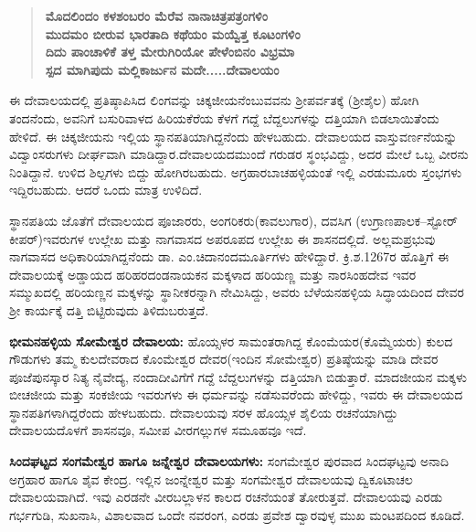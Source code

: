 \begin{verse}
\textbf{ಮೊದಲಿಂದಂ ಕಳಶಂಬರಂ ಮೆರೆವ ನಾನಾಚಿತ್ರಪತ್ರಂಗಳಿಂ} \\\textbf{ಮುದಮಂ ಬೀರುವ ಭಾರತಾದಿ ಕಥೆಯಂ ಮಯ್ವೆತ್ತ ಕೂಟಂಗಳಿಂ} \\\textbf{ದಿದು ಪಾಂಚಾಳಿಕೆ ತಳ್ತ ಮೇರುಗಿರಿಯೋ ಪೇಳೆಂಬಿನಂ ವಿಭ್ರಮಾ} \\\textbf{ಸ್ಪದ ಮಾಗಿಪುದು ಮಲ್ಲಿಕಾರ್ಜುನ ಮದೇ.....ದೇವಾಲಯಂ}
\end{verse}

ಈ ದೇವಾಲಯದಲ್ಲಿ ಪ್ರತಿಷ್ಠಾಪಿಸಿದ ಲಿಂಗವನ್ನು ಚಿಕ್ಕಜೀಯನೆಂಬುವವನು ಶ‍್ರೀಪರ್ವತಕ್ಕೆ (ಶ‍್ರೀಶೈಲ) ಹೋಗಿ ತಂದನೆಂದು, ಅವನಿಗೆ ಬಸುರಿವಾಳದ ಹಿರಿಯಕೆರೆಯ ಕೆಳಗೆ ಗದ್ದೆ ಬೆದ್ದಲುಗಳನ್ನು ದತ್ತಿಯಾಗಿ ಬಿಡಲಾಯಿತೆಂದು ಹೇಳಿದೆ. ಈ ಚಿಕ್ಕಜೀಯನು ಇಲ್ಲಿಯ ಸ್ಥಾನಪತಿಯಾಗಿದ್ದನೆಂದು ಹೇಳಬಹುದು. ದೇವಾಲಯದ ವಾಸ್ತುವರ್ಣನೆಯನ್ನು ವಿದ್ವಾಂಸರುಗಳು ದೀರ್ಘವಾಗಿ ಮಾಡಿದ್ದಾರ.ದೇವಾಲಯದಮುಂದೆ ಗರುಡರ ಸ್ಥಂಭವಿದ್ದು, ಅದರ ಮೇಲೆ ಒಬ್ಬ ವೀರನು ನಿಂತಿದ್ದಾನೆ. ಉಳಿದ ಶಿಲ್ಪಗಳು ಬಿದ್ದು ಹೋಗಿರಬಹುದು. ಅಗ್ರಹಾರಬಾಚಹಳ್ಳಿಯಂತೆ ಇಲ್ಲಿ ಎರಡುಮೂರು ಸ್ತಂಭಗಳು ಇದ್ದಿರಬಹುದು. ಆದರೆ ಒಂದು ಮಾತ್ರ ಉಳಿದಿದೆ.

ಸ್ಥಾನಪತಿಯ ಜೊತೆಗೆ ದೇವಾಲಯದ ಪೂಜಾರರು, ಅಂಗರಿಕರು(ಕಾವಲುಗಾರ), ದವಸಿಗ (ಉಗ್ರಾಣಪಾಲಕ–ಸ್ಟೋರ್​ಕೀಪರ್​)ಇವರುಗಳ ಉಲ್ಲೇಖ ಮತ್ತು ನಾಗವಾಸದ ಅಪರೂಪದ ಉಲ್ಲೇಖ ಈ ಶಾಸನದಲ್ಲಿದೆ. ಅಲ್ಲಮಪ್ರಭುವು ನಾಗವಾಸದ ಅಧಿಕಾರಿಯಾಗಿದ್ದನೆಂದು ಡಾ. ಎಂ.ಚಿದಾನಂದಮೂರ್ತಿಗಳು ಹೇಳಿದ್ದಾರೆ. ಕ್ರಿ.ಶ.1267ರ ಹೊತ್ತಿಗೆ ಈ ದೇವಾಲಯಕ್ಕೆ ಅಡ್ಡಾಯದ ಹರಿಹರದಂಡನಾಯಕನ ಮಕ್ಕಳಾದ ಹರಿಯಣ್ಣ ಮತ್ತು ನಾರಸಿಂಹದೇವ ಇವರ ಸಮ್ಮುಖದಲ್ಲಿ ಹರಿಯಣ್ಣನ ಮಕ್ಕಳನ್ನು ಸ್ಥಾನೀಕರನ್ನಾಗಿ ನೇಮಿಸಿದ್ದು, ಅವರು ಬೆಳೆಯನಹಳ್ಳಿಯ ಸಿದ್ಧಾಯದಿಂದ ದೇವರ ಶ‍್ರೀ ಕಾರ್ಯಕ್ಕೆ ದತ್ತಿ ಬಿಟ್ಟಿರುವುದು ತಿಳಿದುಬರುತ್ತದೆ.

\textbf{ಭೀಮನಹಳ್ಳಿಯ ಸೋಮೇಶ್ವರ ದೇವಾಲಯ:} ಹೊಯ್ಸಳರ ಸಾಮಂತರಾಗಿದ್ದ ಕೊಂಮೆಯರ(ಕೊಮ್ಮೆಯರು) ಕುಲದ ಗೌಡುಗಳು ತಮ್ಮ ಕುಲದೇವರಾದ ಕೊಂಮೇಶ್ವರ ದೇವರ(ಇಂದಿನ ಸೋಮೇಶ್ವರ) ಪ್ರತಿಷ್ಠೆಯನ್ನು ಮಾಡಿ ದೇವರ ಪೂಜೆಪುನಸ್ಕಾರ ನಿತ್ಯ ನೈವೇದ್ಯ, ನಂದಾದೀವಿಗೆಗೆ ಗದ್ದೆ ಬೆದ್ದಲುಗಳನ್ನು ದತ್ತಿಯಾಗಿ ಬಿಡುತ್ತಾರೆ. ಮಾದಜೀಯನ ಮಕ್ಕಳು ಬೀಚಜೀಯ ಮತ್ತು ಸಂಕಜೀಯ ಇವರುಗಳು ಈ ಧರ್ಮವನ್ನು ನಡೆಸುವರೆಂದು ಹೇಳಿದ್ದು, ಇವರು ಈ ದೇವಾಲಯದ ಸ್ಥಾನಪತಿಗಳಾಗಿದ್ದರೆಂದು ಹೇಳಬಹುದು. ದೇವಾಲಯವು ಸರಳ ಹೊಯ್ಸಳ ಶೈಲಿಯ ರಚನೆಯಾಗಿದ್ದು ದೇವಾಲಯದೊಳಗೆ ಶಾಸನವೂ, ಸಮೀಪ ವೀರಗಲ್ಲುಗಳ ಸಮೂಹವೂ ಇದೆ.

\textbf{ಸಿಂದಘಟ್ಟದ ಸಂಗಮೇಶ್ವರ ಹಾಗೂ ಜನ್ನೇಶ್ವರ ದೇವಾಲಯಗಳು: } ಸಂಗಮೇಶ್ವರ ಪುರವಾದ ಸಿಂದಘಟ್ಟವು ಅನಾದಿ ಅಗ್ರಹಾರ ಹಾಗೂ ಶೈವ ಕೇಂದ್ರ. ಇಲ್ಲಿನ ಜಂನ್ನೇಶ್ವರ ಮತ್ತು ಸಂಗಮೇಶ್ವರ ದೇವಾಲಯವು ದ್ವಿಕೂಟಾಚಲ ದೇವಾಲಯವಾಗಿದೆ. ಇವು ಎರಡನೇ ವೀರಬಲ್ಲಾಳನ ಕಾಲದ ರಚನೆಯಂತೆ ತೋರುತ್ತವೆ. ದೇವಾಲಯವು ಎರಡು ಗರ್ಭಗುಡಿ, ಸುಖನಾಸಿ, ವಿಶಾಲವಾದ ಒಂದೇ ನವರಂಗ, ಎರಡು ಪ್ರವೇಶ ದ್ವಾರವುಳ್ಳ ಮುಖ ಮಂಟಪದಿಂದ ಕೂಡಿದೆ.

